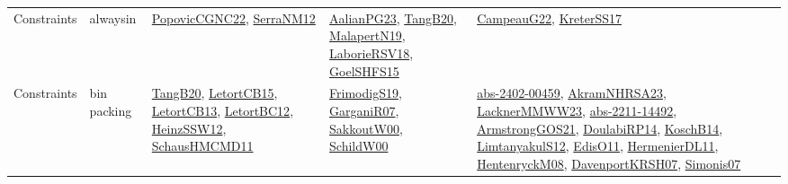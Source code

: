 {\begin{longtable}{llp{6cm}p{6cm}p{6cm}}
Constraints & alwaysin & \href{papers/PopovicCGNC22.pdf}{PopovicCGNC22}\cite{PopovicCGNC22}, \href{papers/SerraNM12.pdf}{SerraNM12}\cite{SerraNM12} & \href{papers/AalianPG23.pdf}{AalianPG23}\cite{AalianPG23}, \href{papers/TangB20.pdf}{TangB20}\cite{TangB20}, \href{papers/MalapertN19.pdf}{MalapertN19}\cite{MalapertN19}, \href{articles/LaborieRSV18.pdf}{LaborieRSV18}\cite{LaborieRSV18}, \href{articles/GoelSHFS15.pdf}{GoelSHFS15}\cite{GoelSHFS15} & \href{articles/CampeauG22.pdf}{CampeauG22}\cite{CampeauG22}, \href{articles/KreterSS17.pdf}{KreterSS17}\cite{KreterSS17}\\
Constraints & bin packing & \href{papers/TangB20.pdf}{TangB20}\cite{TangB20}, \href{articles/LetortCB15.pdf}{LetortCB15}\cite{LetortCB15}, \href{papers/LetortCB13.pdf}{LetortCB13}\cite{LetortCB13}, \href{papers/LetortBC12.pdf}{LetortBC12}\cite{LetortBC12}, \href{articles/HeinzSSW12.pdf}{HeinzSSW12}\cite{HeinzSSW12}, \href{articles/SchausHMCMD11.pdf}{SchausHMCMD11}\cite{SchausHMCMD11} & \href{papers/FrimodigS19.pdf}{FrimodigS19}\cite{FrimodigS19}, \href{papers/GarganiR07.pdf}{GarganiR07}\cite{GarganiR07}, \href{articles/SakkoutW00.pdf}{SakkoutW00}\cite{SakkoutW00}, \href{articles/SchildW00.pdf}{SchildW00}\cite{SchildW00} & \href{articles/abs-2402-00459.pdf}{abs-2402-00459}\cite{abs-2402-00459}, \href{articles/AkramNHRSA23.pdf}{AkramNHRSA23}\cite{AkramNHRSA23}, \href{articles/LacknerMMWW23.pdf}{LacknerMMWW23}\cite{LacknerMMWW23}, \href{articles/abs-2211-14492.pdf}{abs-2211-14492}\cite{abs-2211-14492}, \href{papers/ArmstrongGOS21.pdf}{ArmstrongGOS21}\cite{ArmstrongGOS21}, \href{papers/DoulabiRP14.pdf}{DoulabiRP14}\cite{DoulabiRP14}, \href{papers/KoschB14.pdf}{KoschB14}\cite{KoschB14}, \href{articles/LimtanyakulS12.pdf}{LimtanyakulS12}\cite{LimtanyakulS12}, \href{papers/EdisO11.pdf}{EdisO11}\cite{EdisO11}, \href{papers/HermenierDL11.pdf}{HermenierDL11}\cite{HermenierDL11}, \href{papers/HentenryckM08.pdf}{HentenryckM08}\cite{HentenryckM08}, \href{papers/DavenportKRSH07.pdf}{DavenportKRSH07}\cite{DavenportKRSH07}, \href{articles/Simonis07.pdf}{Simonis07}\cite{Simonis07}\\

\end{longtable}}
